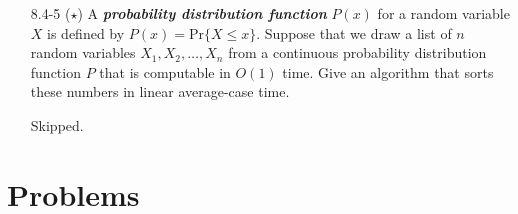 \begin{enumerate}
\begin{framed}
\end{framed}

\item[8.4-5]{($\star$) A \textbf{\emph{probability distribution function}}
$P(x)$ for a random variable $X$ is defined by $P(x) = \text{Pr}\{X \le x\}$.
Suppose that we draw a list of $n$ random variables $X_1, X_2, \dots, X_n$ from
a continuous probability distribution function $P$ that is computable in $O(1)$
time. Give an algorithm that sorts these numbers in linear average-case time.}

\begin{framed}
Skipped.
\end{framed}

\end{enumerate}

\newpage

\section*{Problems}
%

